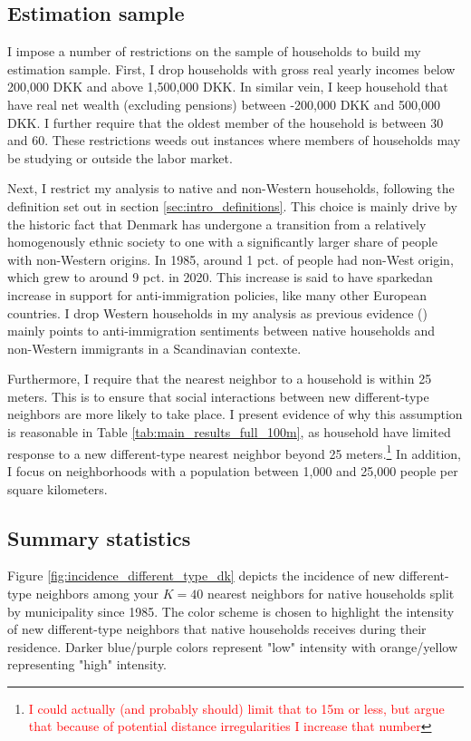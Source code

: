 \documentclass[main.tex]{subfiles}
\begin{document}
\subsection{Estimation sample}
\label{sec:estimation_sample_definition}
I impose a number of restrictions on the sample of households to build my estimation sample. First, I drop households with gross real yearly incomes below 200,000 DKK and above 1,500,000 DKK. In similar vein, I keep household that have real net wealth (excluding pensions) between -200,000 DKK and 500,000 DKK. I further require that the oldest member of the household is between 30 and 60. These restrictions weeds out instances where members of households may be studying or outside the labor market.  

Next, I restrict my analysis to native and non-Western households, following the definition set out in section \ref{sec:intro_definitions}. This choice is mainly drive by the historic fact that Denmark has undergone a transition from a relatively homogenously ethnic society to one with a significantly larger share of people with non-Western origins. In 1985, around 1 pct. of people had non-West origin, which grew to around 9 pct. in 2020. This increase is said to have sparkedan increase in support for anti-immigration policies, like many other European countries. I drop Western households in my analysis as previous evidence (\textcite{bohlmark_willen_2020_tipping, legrand_2002_immigrant_discontent, rockwool_boje2024immigrants}) mainly points to anti-immigration sentiments between native households and non-Western immigrants in a Scandinavian contexte.

Furthermore, I require that the nearest neighbor to a household is within 25 meters. This is to ensure that social interactions between new different-type neighbors are more likely to take place. I present evidence of why this assumption is reasonable in Table \ref{tab:main_results_full_100m}, as household have limited response to a new different-type nearest neighbor beyond 25 meters.\footnote{\textcolor{red}{I could actually (and probably should) limit that to 15m or less, but argue that because of potential distance irregularities I increase that number}} In addition, I focus on neighborhoods with a population between 1,000 and 25,000 people per square kilometers. 

\subsection{Summary statistics}
Figure \ref{fig:incidence_different_type_dk} depicts the incidence of new different-type neighbors among your $K=40$ nearest neighbors for native households split by municipality since 1985. The color scheme is chosen to highlight the intensity of new different-type neighbors that native households receives during their residence. Darker blue/purple colors represent "low" intensity with orange/yellow representing "high" intensity.
\end{document}

